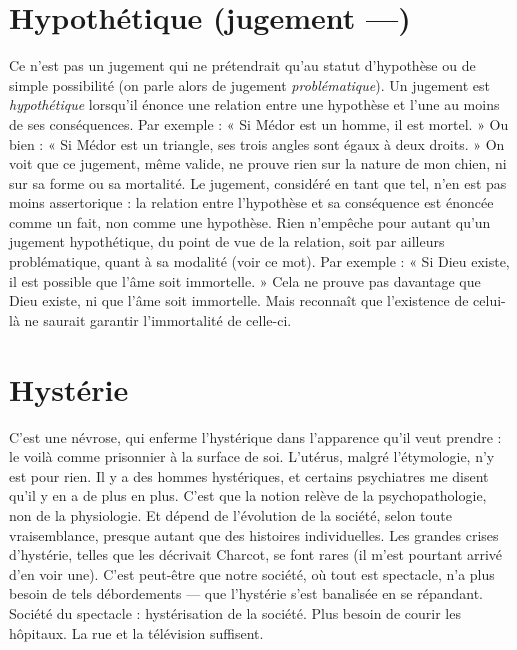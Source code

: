 \section{Hypothétique (jugement —)}
Ce n’est pas un jugement qui ne prétendrait
qu’au statut d’hypothèse ou
de simple possibilité (on parle alors de jugement {\it problématique}). Un jugement
est {\it hypothétique} lorsqu'il énonce une relation entre une hypothèse et l’une au
moins de ses conséquences. Par exemple : « Si Médor est un homme, il est
mortel. » Ou bien : « Si Médor est un triangle, ses trois angles sont égaux à
deux droits. » On voit que ce jugement, même valide, ne prouve rien sur la
nature de mon chien, ni sur sa forme ou sa mortalité. Le jugement, considéré
en tant que tel, n’en est pas moins assertorique : la relation entre l’hypothèse et
sa conséquence est énoncée comme un fait, non comme une hypothèse. Rien
n'empêche pour autant qu’un jugement hypothétique, du point de vue de la
relation, soit par ailleurs problématique, quant à sa modalité (voir ce mot). Par
exemple : « Si Dieu existe, il est possible que l’âme soit immortelle. » Cela ne
prouve pas davantage que Dieu existe, ni que l’âme soit immortelle. Mais
reconnaît que l'existence de celui-là ne saurait garantir l’immortalité de celle-ci.

\section{Hystérie}
C’est une névrose, qui enferme l’hystérique dans l'apparence
qu’il veut prendre : le voilà comme prisonnier à la surface de
soi. L’utérus, malgré l’étymologie, n’y est pour rien. Il y a des hommes hystériques,
et certains psychiatres me disent qu’il y en a de plus en plus. C’est que
la notion relève de la psychopathologie, non de la physiologie. Et dépend de
l’évolution de la société, selon toute vraisemblance, presque autant que des histoires
individuelles. Les grandes crises d’hystérie, telles que les décrivait
Charcot, se font rares (il m’est pourtant arrivé d’en voir une). C’est peut-être
que notre société, où tout est spectacle, n’a plus besoin de tels débordements —
que l’hystérie s’est banalisée en se répandant. Société du spectacle : hystérisation
de la société. Plus besoin de courir les hôpitaux. La rue et la télévision suffisent.

